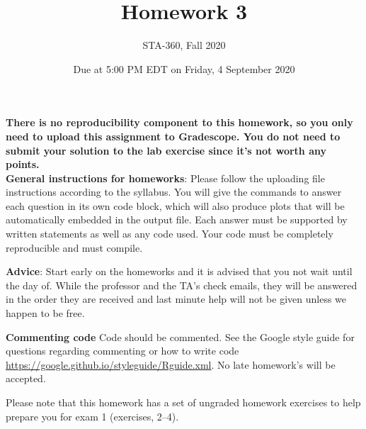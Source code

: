 \documentclass{article}
\begin{document}
\title{Homework 3}
\author{STA-360, Fall 2020}
\date{Due at 5:00 PM EDT  on Friday, 4 September 2020}
\maketitle

\textbf{There is no reproducibility component to this homework, so you only need to upload this assignment to Gradescope. You do not need to submit your solution to the lab exercise since it's not worth any points.}\\

\textbf{General instructions for homeworks}: Please follow the uploading file instructions according to the syllabus. You will give the commands to answer each question in its own code block, which will also produce plots that will be automatically embedded in the output file. Each answer must be supported by written statements as well as any code used. Your code must be completely reproducible and must compile. 

\textbf{Advice}: Start early on the homeworks and it is advised that you not wait until the day of. While the professor and the TA's check emails, they will be answered in the order they are received and last minute help will not be given unless we happen to be free.  

\textbf{Commenting code}
Code should be commented. See the Google style guide for questions regarding commenting or how to write 
code \url{https://google.github.io/styleguide/Rguide.xml}. No late homework's will be accepted.


Please note that this homework has a set of ungraded homework exercises to
help prepare you for exam 1 (exercises, 2--4). 
\end{document}
